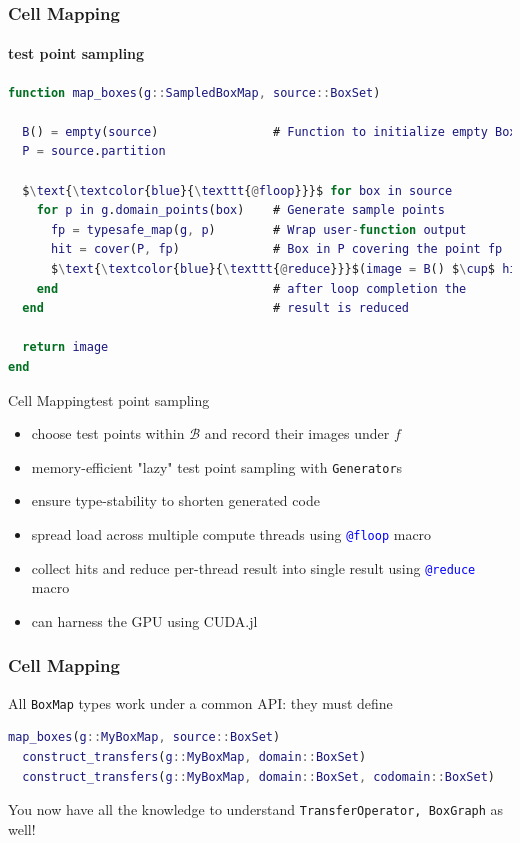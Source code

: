 \documentclass[
  english,            %
  aspectratio=169,    %
]{tumbeamer}
\newcommand{\cB}{\mathcal{B}}
\begin{document}
\begin{frame}[fragile]
\frametitle{Cell Mapping}
\framesubtitle{test point sampling}

\medskip

\begin{lstlisting}[language=Matlab,mathescape]
function map_boxes(g::SampledBoxMap, source::BoxSet)

  B() = empty(source)                # Function to initialize empty BoxSet
  P = source.partition

  $\text{\textcolor{blue}{\texttt{@floop}}}$ for box in source
    for p in g.domain_points(box)    # Generate sample points
      fp = typesafe_map(g, p)        # Wrap user-function output
      hit = cover(P, fp)             # Box in P covering the point fp
      $\text{\textcolor{blue}{\texttt{@reduce}}}$(image = B() $\cup$ hit) $\quad\ \ \,$   # Each thread collects hits,
    end                              # after loop completion the 
  end                                # result is reduced

  return image
end 
\end{lstlisting}

\end{frame}

\begin{frame}{Cell Mapping}{test point sampling}
  
\begin{itemize}
  \item choose test points within $\cB$ and record their images under $f$
  \item memory-efficient "lazy" test point sampling with \texttt{Generator}s
  \item ensure type-stability to shorten generated code
  \item spread load across multiple compute threads using \textcolor{blue}{\texttt{@floop}} macro
  \item collect hits and reduce per-thread result into single result using \textcolor{blue}{\texttt{@reduce}} macro
  \item can harness the GPU using CUDA.jl
\end{itemize}

\end{frame}

\begin{frame}[fragile]
\frametitle{Cell Mapping}

All \texttt{BoxMap} types work under a common API: they must define 

\begin{lstlisting}[language=Matlab,mathescape]
  map_boxes(g::MyBoxMap, source::BoxSet)
  construct_transfers(g::MyBoxMap, domain::BoxSet)
  construct_transfers(g::MyBoxMap, domain::BoxSet, codomain::BoxSet)
\end{lstlisting}

You now have all the knowledge to understand \texttt{TransferOperator, BoxGraph} as well! 
  
\end{frame}
\end{document}
